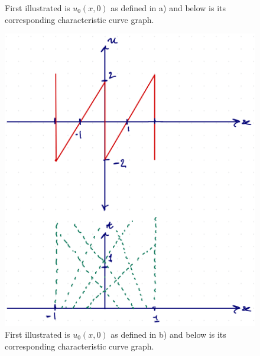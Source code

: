 \begin{solution}
\begin{figure}[H]
    \caption{First illustrated is $u_{0}(x,0)$ as defined in a) and below is its corresponding characteristic curve graph.}
\end{figure}
\begin{figure}[H]
    \centering
    \includegraphics[scale=0.21]{./figures/q5-triangular-char.png}
    \caption{First illustrated is $u_{0}(x,0)$ as defined in b) and below is its corresponding characteristic curve graph.}
\end{figure}
\end{solution}

